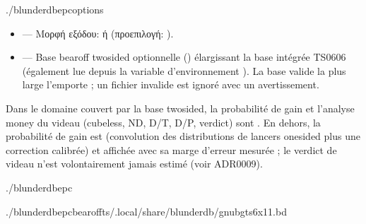 \documentclass[letterpaper,10pt,greek]{sphinxmanual}
\begin{document}
\begin{sphinxVerbatim}[commandchars=\\\{\}]
./blunderdbepc\PYG{o}{[}options\PYG{o}{]}
\end{sphinxVerbatim}

\sphinxAtStartPar
{}
\begin{itemize}
\item {} 
\sphinxAtStartPar
{} — Μορφή εξόδου:  ή  (προεπιλογή: ).

\item {} 
\sphinxAtStartPar
{} — Base bearoff two\sphinxhyphen{}sided optionnelle () élargissant
la base intégrée TS\sphinxhyphen{}06\sphinxhyphen{}06 (également lue depuis la variable d’environnement
). La base valide la plus large l’emporte ; un fichier
invalide est ignoré avec un avertissement.

\end{itemize}

\sphinxAtStartPar
{} Dans le domaine couvert par la base two\sphinxhyphen{}sided, la probabilité de
gain et l’analyse money du videau (cubeless, ND, D/T, D/P, verdict) sont
. En dehors, la probabilité de gain est  (convolution
des distributions de lancers one\sphinxhyphen{}sided plus une correction calibrée) et
affichée avec sa marge d’erreur mesurée ; le verdict de videau n’est
volontairement jamais estimé (voir ADR\sphinxhyphen{}0009).

\sphinxAtStartPar
{}

\begin{sphinxVerbatim}[commandchars=\\\{\}]
./blunderdbepc

./blunderdbepc\PYGZhy{}\PYGZhy{}bearoff\PYGZhy{}ts\PYGZti{}/.local/share/blunderdb/gnubg\PYGZus{}ts6x11.bd
\end{sphinxVerbatim}
\end{document}
